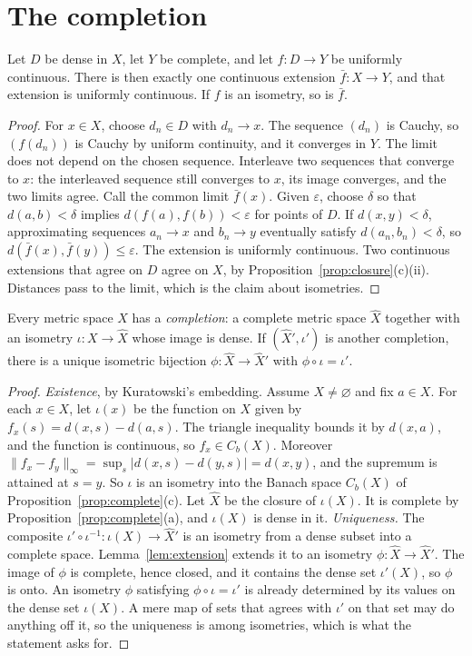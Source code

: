 \section{The completion}

\begin{lemma}[extension]\label{lem:extension}
Let $D$ be dense in $X$, let $Y$ be complete, and let $f:D\to Y$ be uniformly continuous. There is then exactly one continuous extension $\bar f:X\to Y$, and that extension is uniformly continuous. If $f$ is an isometry, so is $\bar f$.
\end{lemma}
\begin{proof}
For $x\in X$, choose $d_n\in D$ with $d_n\to x$. The sequence $(d_n)$ is Cauchy, so $(f(d_n))$ is Cauchy by uniform continuity, and it converges in $Y$. The limit does not depend on the chosen sequence. Interleave two sequences that converge to $x$: the interleaved sequence still converges to $x$, its image converges, and the two limits agree. Call the common limit $\bar f(x)$. Given $\varepsilon$, choose $\delta$ so that $d(a,b)<\delta$ implies $d(f(a),f(b))<\varepsilon$ for points of $D$. If $d(x,y)<\delta$, approximating sequences $a_n\to x$ and $b_n\to y$ eventually satisfy $d(a_n,b_n)<\delta$, so $d(\bar f(x),\bar f(y))\le\varepsilon$. The extension is uniformly continuous. Two continuous extensions that agree on $D$ agree on $X$, by Proposition~\ref{prop:closure}(c)(ii). Distances pass to the limit, which is the claim about isometries.
\end{proof}

\begin{theorem}[completion]\label{thm:completion}
Every metric space $X$ has a \emph{completion}: a complete metric space $\hat X$ together with an isometry $\iota:X\to\hat X$ whose image is dense. If $(\hat X',\iota')$ is another completion, there is a unique isometric bijection $\phi:\hat X\to\hat X'$ with $\phi\circ\iota=\iota'$.
\end{theorem}
\begin{proof}
\emph{Existence}, by Kuratowski's embedding. Assume $X\ne\varnothing$ and fix $a\in X$. For each $x\in X$, let $\iota(x)$ be the function on $X$ given by $f_x(s)=d(x,s)-d(a,s)$. The triangle inequality bounds it by $d(x,a)$, and the function is continuous, so $f_x\in C_b(X)$. Moreover $\|f_x-f_y\|_\infty=\sup_s|d(x,s)-d(y,s)|=d(x,y)$, and the supremum is attained at $s=y$. So $\iota$ is an isometry into the Banach space $C_b(X)$ of Proposition~\ref{prop:complete}(c). Let $\hat X$ be the closure of $\iota(X)$. It is complete by Proposition~\ref{prop:complete}(a), and $\iota(X)$ is dense in it. \emph{Uniqueness.} The composite $\iota'\circ\iota^{-1}:\iota(X)\to\hat X'$ is an isometry from a dense subset into a complete space. Lemma~\ref{lem:extension} extends it to an isometry $\phi:\hat X\to\hat X'$. The image of $\phi$ is complete, hence closed, and it contains the dense set $\iota'(X)$, so $\phi$ is onto. An isometry $\phi$ satisfying $\phi\circ\iota=\iota'$ is already determined by its values on the dense set $\iota(X)$. A mere map of sets that agrees with $\iota'$ on that set may do anything off it, so the uniqueness is among isometries, which is what the statement asks for.
\end{proof}

